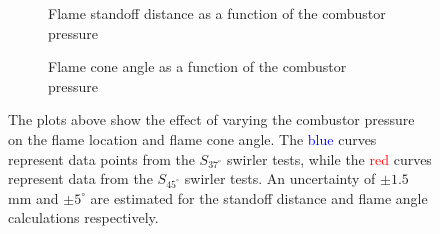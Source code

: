 \begin{figure}

\begin{subfigure}{\linewidth}
  \centering
  
  \caption{Flame standoff distance as a function of the combustor pressure}
  \label{fig:pressureDistance}
\end{subfigure}

\begin{subfigure}{\linewidth}
  \centering
  
  \caption{Flame cone angle as a function of the combustor pressure}
  \label{fig:pressureAngle}
\end{subfigure}

\caption[Effect of combustor pressure on the flame location and shape]{The plots above show the effect of varying the combustor pressure on the flame location and flame cone angle. The \textcolor{blue}{blue} curves represent data points from the \(S_{37^\circ}\) swirler tests, while the \textcolor{red}{red} curves represent data from the \(S_{45^\circ}\) swirler tests. An uncertainty of \(\pm 1.5\) mm and \(\pm 5^\circ\) are estimated for the standoff distance and flame angle calculations respectively.}

\label{fig:pressureResults}

\end{figure}

